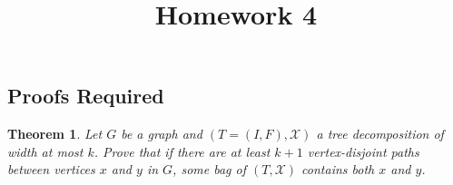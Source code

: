 \documentclass{article}
\title{Homework 4}
\newtheorem*{theorem}{Theorem}
\newtheorem{definition}{Definition}
\begin{document}
\maketitle

%


\subsection*{Proofs Required}

\begin{theorem} Let $G$ be a graph and $(T = (I,F), \mathcal{X})$ a tree decomposition
  of width at most $k$. Prove that if there are at least $k+1$ vertex-disjoint
  paths between vertices $x$ and $y$ in $G$, some bag of $(T,\mathcal{X})$ contains
  both $x$ and $y$.
\end{theorem}
\end{document}
